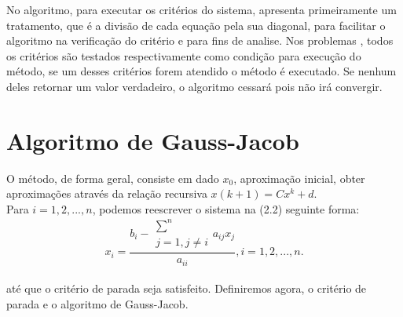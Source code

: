 \documentclass[
12pt,				%
openright,			%
twoside,			%
a4paper,			%
english,			%
french,				%
spanish,			%
brazil				%
]{abntex2_new}
\begin{document}
		No algoritmo, para executar os critérios do sistema, apresenta 
		primeiramente um tratamento, que é a divisão de cada equação pela sua diagonal,
		para
		facilitar o algoritmo na verificação do critério e para fins de analise.
		Nos problemas , todos os critérios são testados respectivamente como condição
		para
		execução do método, se um desses critérios forem atendido o método é executado.
		Se nenhum deles retornar um valor verdadeiro, o algoritmo cessará pois não irá
		convergir.
		
		
		\section{Algoritmo de Gauss-Jacob}
		O método, de forma geral, consiste em dado $x_0$, aproximação inicial, 
		obter aproximações através da relação recursiva $x{(k+1)}=Cx^k + d$.\\
		Para $i = 1,2,...,n$, podemos reescrever o sistema na (2.2) seguinte forma:\\
		$$x_i = \frac{b_i - \substack{\sum^{n} \\j=1,j \neq i}a_{ij}x_j}{a_{ii}}, i =
		1,2,...,n.$$\\
		até que o critério de parada seja satisfeito. Definiremos agora, o critério de
		parada e o 
		algoritmo de Gauss-Jacob.
		
\end{document}
